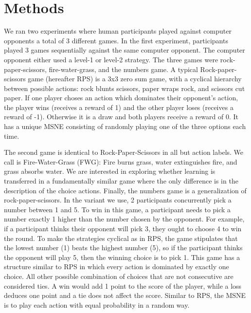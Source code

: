 \documentclass[12pt]{article}         %
\begin{document}
\section*{Methods}

We ran two experiments where human participants played against computer opponents a total of 3 different games. In the first experiment, participants played 3 games sequentially against the same computer opponent. The computer opponent either used a level-1 or level-2 strategy. The three games were rock-paper-scissors, fire-water-grass, and the numbers game.  A typical Rock-paper-scissors game (hereafter RPS) is a 3x3 zero sum game, with a cyclical hierarchy between possible actions: rock blunts scissors, paper wraps rock, and scissors cut paper. If one player choses an action which dominates their opponent's action, the player wins (receives a reward of 1) and the other player loses (receives a reward of -1). Otherwise it is a draw and both players receive a reward of 0. It has a unique MSNE consisting of randomly playing one of the three options each time.  

The second game is identical to Rock-Paper-Scissors in all but action labels. We call is Fire-Water-Grass (FWG): Fire burns grass, water extinguishes fire, and grass absorbs water. We are interested in exploring whether learning is transferred in a fundamentally similar game where the only difference is in the description of the choice actions.  Finally, the numbers game is a generalization of rock-paper-scissors. In the variant we use, 2 participants concurrently pick a number between 1 and 5. To win in this game, a participant needs to pick a number exactly 1 higher than the number chosen by the opponent. For example, if a participant thinks their opponent will pick 3, they ought to choose 4 to win the round. To make the strategies cyclical as in RPS, the game stipulates that the lowest number (1) beats the highest number (5), so if the participant thinks the opponent will play 5, then the winning choice is to pick 1. This game has a structure similar to RPS in which every action is dominated by exactly one choice. All other possible combination of choices that are not consecutive are considered ties. A win would add 1 point to the score of the player, while a loss deduces one point and a tie does not affect the score. Similar to RPS, the MSNE is to play each action with equal probability in a random way.  
\end{document}
